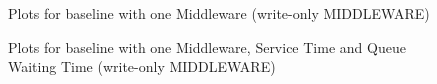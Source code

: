 \documentclass[11pt,a4paper]{article}
\begin{document}
\begin{figure}[!h]
  \centering
  \caption{Plots for baseline with one Middleware (write-only MIDDLEWARE)}
  \label{fig:baseline_mw_1_mw_mw_wo}
\end{figure}

\begin{figure}[!h]
  \centering
  \caption{Plots for baseline with one Middleware, Service Time and Queue Waiting Time (write-only MIDDLEWARE)}
  \label{fig:baseline_mw_1_mw_mw_c_wo}
\end{figure}
\end{document}
